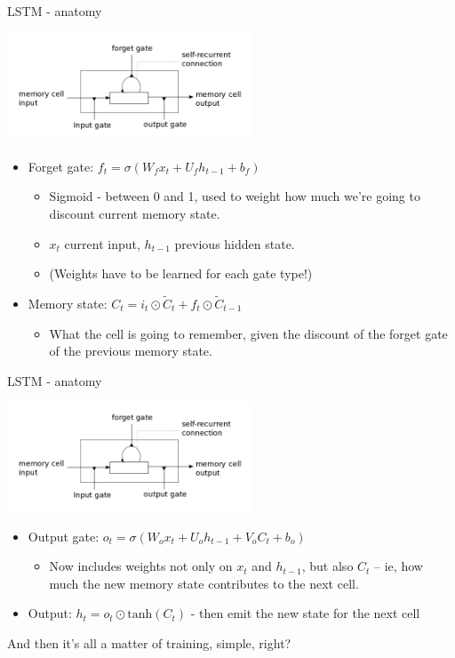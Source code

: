 \documentclass[xcolor=pdftex,x11names,table,hyperref]{beamer}
\begin{document}
\begin{frame}{LSTM - anatomy}
  \begin{center}
    \includegraphics[width=0.55\textwidth]{images/lstm_memorycell.png}
  \end{center}
  
  \begin{itemize}
  \item Forget gate: $ f_t = \sigma( W_f x_t + U_f h_{t-1} + b_f ) $
    \begin{itemize}
    \item Sigmoid - between 0 and 1, used to weight how much we're going to discount current memory state. 
    \item $x_t$ current input, $h_{t-1}$ previous hidden state.      
    \item (Weights have to be learned for each gate type!)
    \end{itemize}\pause
  \item Memory state: $ C_t = i_t \odot \tilde{C}_t + f_t \odot \tilde{C}_{t-1} $	
    \begin{itemize}
    \item What the cell is going to remember, given the discount of the forget gate of the previous memory state.
    \end{itemize}
  \end{itemize}
\end{frame}

\begin{frame}{LSTM - anatomy}
  \begin{center}
    \includegraphics[width=0.55\textwidth]{images/lstm_memorycell.png}
  \end{center}
  
  \begin{itemize}
  \item Output gate: $ o_t = \sigma(W_o x_t + U_o h_{t-1} + V_o C_t + b_o) $ 
    \begin{itemize}
    \item Now includes weights not only on $x_t$ and $h_{t-1}$, but also $C_t$ -- ie, how much the 
      new memory state contributes to the next cell.
    \end{itemize}\pause
  \item Output: $ h_t = o_t \odot \text{tanh}(C_t) $ - then emit the new state for the next cell
  \end{itemize}\pause
  And then it's all a matter of training, simple, right?
\end{frame}
\end{document}
